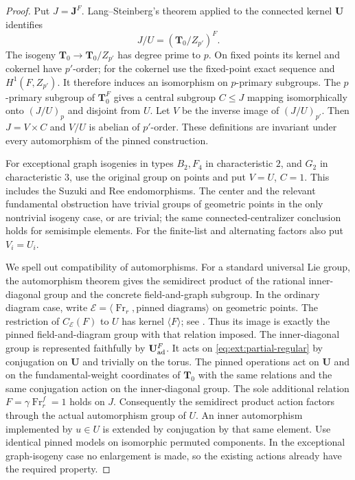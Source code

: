 \begin{proof}
Put $J=\mathbf J^F$.  Lang--Steinberg's theorem
\cite[Theorem~21.7]{MalleTesterman} applied to the connected kernel
$\mathbf U$ identifies
\[
 J/U=(\mathbf T_0/Z_{p'})^F.
\]
The isogeny $\mathbf T_0\to\mathbf T_0/Z_{p'}$ has degree prime to
$p$.  On fixed points its kernel and cokernel have $p'$-order; for
the cokernel use the fixed-point exact sequence and $H^1(F,Z_{p'})$.
It therefore induces an isomorphism on $p$-primary subgroups.  The
$p$-primary subgroup of $\mathbf T_0^F$ gives a central subgroup
$C\leq J$ mapping isomorphically onto $(J/U)_p$ and disjoint from
$U$.  Let $V$ be the inverse image of $(J/U)_{p'}$.  Then
$J=V\times C$ and $V/U$ is abelian of $p'$-order.  These definitions
are invariant under every automorphism of the pinned construction.

For exceptional graph isogenies in types $B_2,F_4$ in characteristic
$2$, and $G_2$ in characteristic $3$, use the original group on
points and put $V=U$, $C=1$.  This includes the Suzuki and Ree
endomorphisms.  The center and the relevant fundamental obstruction
have trivial groups of geometric points in the only nontrivial
isogeny case, or are trivial; the same connected-centralizer
conclusion holds for semisimple elements.  For the finite-list and
alternating factors also put $V_i=U_i$.

We spell out compatibility of automorphisms.  For a standard
universal Lie group, the automorphism theorem
\cite[Definition~3.3 and Theorem~3.4]{BMO} gives the semidirect
product of the rational inner-diagonal group and the concrete
field-and-graph subgroup.  In the ordinary diagram case, write
$\mathcal E=\langle\operatorname{Fr}_r,\text{pinned diagrams}\rangle$
on geometric points.  The restriction of $C_{\mathcal E}(F)$ to
$U$ has kernel $\langle F\rangle$; see \cite[Section~2.2]{SpaethD}.
Thus its image is exactly the pinned field-and-diagram group with
that relation imposed.  The inner-diagonal group is represented
faithfully by $\mathbf U_{\rm ad}^F$.  It acts on
\eqref{eq:ext:partial-regular} by conjugation on $\mathbf U$ and
trivially on the torus.  The pinned operations act on $\mathbf U$
and on the fundamental-weight coordinates of $\mathbf T_0$ with
the same relations and the same conjugation action on the
inner-diagonal group.  The sole additional relation
$F=\gamma\operatorname{Fr}_r^f=1$ holds on $J$.  Consequently the
semidirect product action factors through the actual automorphism
group of $U$.  An inner automorphism implemented by $u\in U$ is
extended by conjugation by that same element.  Use identical
pinned models on isomorphic permuted components.  In the
exceptional graph-isogeny case no enlargement is made, so the
existing actions already have the required property.


\end{proof}
